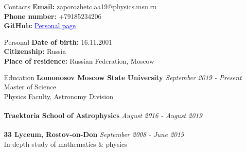 \documentclass{resume} %
\newcommand{\link}[2]{\href{#1}{\textcolor{blue}{\underline{#2}}}}
\begin{document}
	\begin{rSection}{Contacts}
		\textbf{Email: } zaporozhetc.aa19@physics.msu.ru
		\\ \textbf{Phone number: } +79185234206
		\\ \textbf{GitHub: } \link{https://github.com/Kraysent}{Personal page}
	\end{rSection}		

	\begin{rSection}{Personal}
		\textbf{Date of birth: } 16.11.2001
		\\ \textbf{Citizenship: } Russia
		\\ \textbf{Place of residence: } Russian Federation, Moscow
	\end{rSection}

	\begin{rSection}{Education}
		\textbf{Lomonosov Moscow State University} \hfill \textit{September 2019 - Present}
		\\ Master of Science
		\\ Physics Faculty, Astronomy Division \\
		\\ \textbf{Traektoria School of Astrophysics} \hfill \textit{August 2016 - August 2019} \\
		\\ \textbf{33 Lyceum, Rostov-on-Don} \hfill \textit{September 2008 - June 2019}
		\\ In-depth study of mathematics \& physics
	\end{rSection}
	
\end{document}
